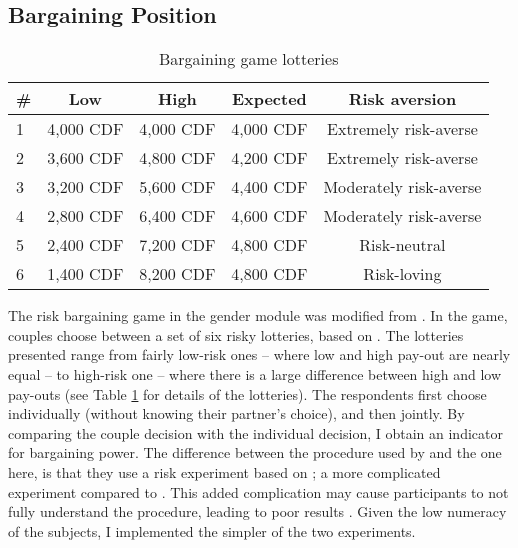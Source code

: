 \documentclass[10pt,a4paper,abstract=on]{scrartcl} %
\begin{document}
\subsection*{Bargaining Position}

\begin{table}[htb]
	\centering
	\caption{Bargaining game lotteries}
	\label{tab:bargaining}
	\begin{tabular}{l c c c c}
	\toprule
	\# & Low & High & Expected & Risk aversion \\
	\hline
	1 & 4,000 CDF & 4,000 CDF & 4,000 CDF & Extremely risk-averse \\
	2 & 3,600 CDF & 4,800 CDF & 4,200 CDF & Extremely risk-averse \\
	3 & 3,200 CDF & 5,600 CDF & 4,400 CDF & Moderately risk-averse \\
	4 & 2,800 CDF & 6,400 CDF & 4,600 CDF & Moderately risk-averse \\
	5 & 2,400 CDF & 7,200 CDF & 4,800 CDF & Risk-neutral \\
	6 & 1,400 CDF & 8,200 CDF & 4,800 CDF & Risk-loving \\ 
	\bottomrule
	\end{tabular}
\end{table}

The risk bargaining game in the gender module was modified from \cite{Martinsson2009}. In the game, couples choose between a set of six risky lotteries, based on \cite{Eckel2002}. The lotteries presented range from fairly low-risk ones -- where low and high pay-out are nearly equal -- to high-risk one -- where there is a large difference between high and low pay-outs (see Table \ref{tab:bargaining} for details of the lotteries). The respondents first choose individually (without knowing their partner's choice), and then jointly. By comparing the couple decision with the individual decision, I obtain an indicator for bargaining power. The difference between the procedure used by \cite{Martinsson2009} and the one here, is that they use a risk experiment based on \cite{Holt2002}; a more complicated experiment compared to \citeauthor{Eckel2002}. This added complication may cause participants to not fully understand the procedure, leading to poor results \citep{Dave2010a}. Given the low numeracy of the subjects, I implemented the simpler of the two experiments.
\end{document}
